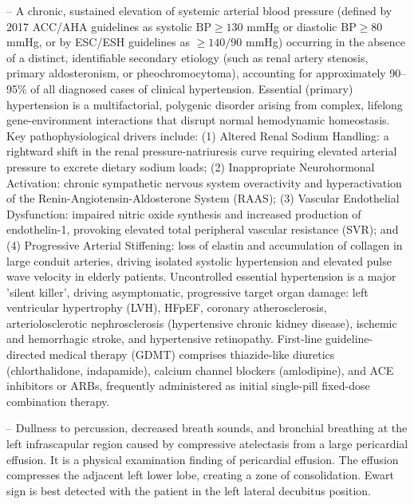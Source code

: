 -- A chronic, sustained elevation of systemic arterial blood pressure (defined by 2017 ACC/AHA guidelines as systolic $\text{BP} \ge 130$ mmHg or diastolic $\text{BP} \ge 80$ mmHg, or by ESC/ESH guidelines as $\ge 140/90$ mmHg) occurring in the absence of a distinct, identifiable secondary etiology (such as renal artery stenosis, primary aldosteronism, or pheochromocytoma), accounting for approximately 90--95\% of all diagnosed cases of clinical hypertension. Essential (primary) hypertension is a multifactorial, polygenic disorder arising from complex, lifelong gene-environment interactions that disrupt normal hemodynamic homeostasis. Key pathophysiological drivers include: (1) Altered Renal Sodium Handling: a rightward shift in the renal pressure-natriuresis curve requiring elevated arterial pressure to excrete dietary sodium loads; (2) Inappropriate Neurohormonal Activation: chronic sympathetic nervous system overactivity and hyperactivation of the Renin-Angiotensin-Aldosterone System (RAAS); (3) Vascular Endothelial Dysfunction: impaired nitric oxide synthesis and increased production of endothelin-1, provoking elevated total peripheral vascular resistance (SVR); and (4) Progressive Arterial Stiffening: loss of elastin and accumulation of collagen in large conduit arteries, driving isolated systolic hypertension and elevated pulse wave velocity in elderly patients. Uncontrolled essential hypertension is a major 'silent killer', driving asymptomatic, progressive target organ damage: left ventricular hypertrophy (LVH), HFpEF, coronary atherosclerosis, arteriolosclerotic nephrosclerosis (hypertensive chronic kidney disease), ischemic and hemorrhagic stroke, and hypertensive retinopathy. First-line guideline-directed medical therapy (GDMT) comprises thiazide-like diuretics (chlorthalidone, indapamide), calcium channel blockers (amlodipine), and ACE inhibitors or ARBs, frequently administered as initial single-pill fixed-dose combination therapy.

-- Dullness to percussion, decreased breath sounds, and bronchial breathing at the left infrascapular region caused by compressive atelectasis from a large pericardial effusion. It is a physical examination finding of pericardial effusion. The effusion compresses the adjacent left lower lobe, creating a zone of consolidation. Ewart sign is best detected with the patient in the left lateral decubitus position.

